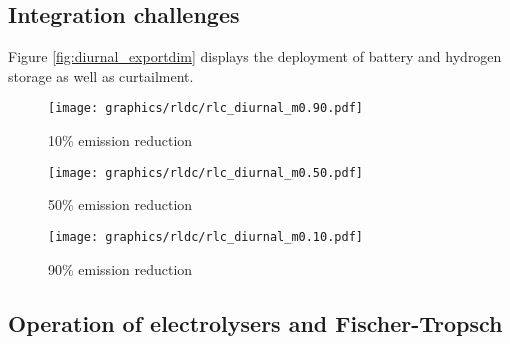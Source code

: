 \subsection{Integration challenges}


Figure \ref{fig:diurnal_exportdim} displays the deployment of battery and hydrogen storage as well as curtailment.

\begin{figure*}[t] %
    \centering
    \begin{subfigure}[b]{0.3\linewidth}
        \centering
        \texttt{[image: graphics/rldc/rlc\_diurnal\_m0.90.pdf]}
        \caption{10\% emission reduction}
        \label{fig:diurnal_10emred}
    \end{subfigure}
    \hfill
    \begin{subfigure}[b]{0.3\linewidth}
        \centering
        \texttt{[image: graphics/rldc/rlc\_diurnal\_m0.50.pdf]}
        \caption{50\% emission reduction}
        \label{fig:diurnal_50emred}
    \end{subfigure}
    \hfill
    \begin{subfigure}[b]{0.3\linewidth}
        \centering
        \texttt{[image: graphics/rldc/rlc\_diurnal\_m0.10.pdf]}
        \caption{90\% emission reduction}
        \label{fig:diurnal_90emred}
    \end{subfigure}
    \hfill
    \caption{Export dependent (0 - 200 TWh) residual load curves with various integration options. Each row represents different integration strategies (RLC without integration, RLC with curtailment, RLC with curtailment and electrolyser load).
    Each column represents different climate ambitions (10 - 90\% emission reduction)}
    \label{fig:diurnal_exportdim}
\end{figure*}



\subsection{Operation of electrolysers and Fischer-Tropsch}


